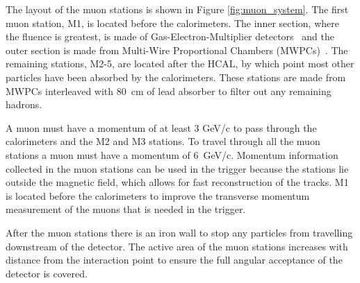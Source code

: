 The layout of the muon stations is shown in Figure \ref{fig:muon_system}. 
The first muon station, M1,  is located before the calorimeters. The inner section, where the fluence is greatest, is made of Gas-Electron-Multiplier detectors~\cite{Bencivenni:691604} and the outer section is made from Multi-Wire Proportional Chambers (MWPCs)~\cite{Botchine:2002ela}. The remaining stations, M2-5, are located after the HCAL, by which point most other particles have been absorbed by the calorimeters. These stations are made from MWPCs interleaved with 80~cm of lead absorber to filter out any remaining hadrons. %



A muon must have a momentum of at least 3 GeV/c to pass through the calorimeters and the M2 and M3 stations. To travel through all the muon stations a muon must have a momentum of 6~GeV/c. 
Momentum information collected in the muon stations can be used in the trigger because the stations lie outside the magnetic field, which allows for fast reconstruction of the tracks. M1 is located before the calorimeters to improve the transverse momentum measurement of the muons that is needed in the trigger.



After the muon stations there is an iron wall to stop any particles from travelling downstream of the detector. The active area of the muon stations increases with distance from the interaction point to ensure the full angular acceptance of the detector is covered. %

